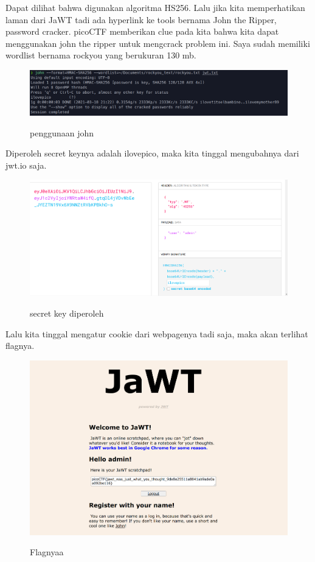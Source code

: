 \documentclass[a4paper,12pt]{article}
\begin{document}
Dapat dilihat bahwa digunakan algoritma HS256. Lalu jika kita memperhatikan laman dari JaWT tadi ada hyperlink ke tools bernama John the Ripper, password cracker. picoCTF memberikan clue pada kita bahwa kita dapat menggunakan john the ripper untuk mengcrack problem ini.
Saya sudah memiliki wordlist bernama rockyou yang berukuran 130 mb.
\begin{figure}[H]
 \centering
\includegraphics[width=1\textwidth]{jwtscratch3.png}\\
\caption{penggunaan john}
\end{figure}
Diperoleh secret keynya adalah ilovepico, maka kita tinggal mengubahnya dari jwt.io saja.
\begin{figure}[H]
 \centering
\includegraphics[width=1\textwidth]{jwtscratch4.png}\\
\caption{secret key diperoleh}
\end{figure}
Lalu kita tinggal mengatur cookie dari webpagenya tadi saja, maka akan terlihat flagnya.
\begin{figure}[H]
 \centering
\includegraphics[width=1\textwidth]{jwtscratchflag.png}\\
\caption{Flagnyaa}
\end{figure}
\end{document}
